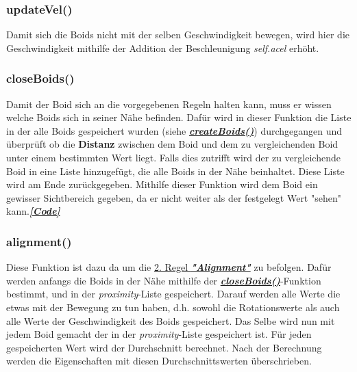 \documentclass[a4paper, hidelinks, 12pt]{article}
\begin{document}
\subsubsection{updateVel()}\label{sec:updateVel}
Damit sich die Boids nicht mit der selben Geschwindigkeit bewegen, wird hier die Geschwindigkeit mithilfe der Addition der Beschleunigung \emph{self.acel} erhöht.
\newline
		
\subsubsection{closeBoids()}\label{sec:closeBoids}
Damit der Boid sich an die vorgegebenen Regeln halten kann, muss er wissen welche Boids sich in seiner Nähe befinden. Dafür wird in dieser Funktion die Liste in der alle Boids gespeichert wurden (siehe \hyperref[sec:createBoids]{\emph{\textbf{createBoids()}}}) durchgegangen und überprüft ob die \textbf{Distanz}\cite{distance} zwischen dem Boid und dem zu vergleichenden Boid unter einem bestimmten Wert liegt. Falls dies zutrifft wird der zu vergleichende Boid in eine Liste hinzugefügt, die alle Boids in der Nähe beinhaltet. Diese Liste wird am Ende zurückgegeben. Mithilfe dieser Funktion wird dem Boid ein gewisser Sichtbereich gegeben, da er nicht weiter als der festgelegt Wert "sehen" kann.\hyperref[CodecloseBoids]{\textbf{\emph{[Code]}}}
\newline
		
\subsubsection{alignment()}\label{sec:alignment}
Diese Funktion ist dazu da um die \hyperref[sec:Alignment]{2. Regel \textbf{\emph{"Alignment"}}} zu befolgen. Dafür werden anfangs die Boids in der Nähe mithilfe der \hyperref[sec:closeBoids]{\emph{\textbf{closeBoids()}}}-Funktion bestimmt, und in der \emph{proximity}-Liste gespeichert. Darauf werden alle Werte die etwas mit der Bewegung zu tun haben, d.h. sowohl die Rotationswerte als auch alle Werte der Geschwindigkeit des Boids gespeichert. Das Selbe wird nun mit jedem Boid gemacht der in der \emph{proximity}-Liste gespeichert ist. Für jeden gespeicherten Wert wird der Durchschnitt berechnet. Nach der Berechnung werden die Eigenschaften mit diesen Durchschnittswerten überschrieben.
\newline\newline
\end{document}
